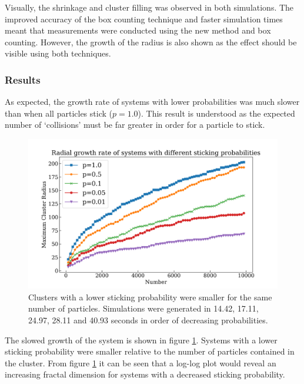 \documentclass[%
 aapm,
 mph,%
 amsmath,amssymb,
 reprint,%
]{revtex4-2}
\begin{document}
Visually, the shrinkage and cluster filling was observed in both simulations. The improved accuracy of the box counting technique and faster simulation times meant that measurements were conducted using the new method and box counting. However, the growth of the radius is also shown as the effect should be visible using both techniques.
\subsubsection{\label{sec:sticking_results}Results}
As expected, the growth rate of systems with lower probabilities was much slower than when all particles stick ($p=1.0$). This result is understood as the expected number of `collisions' must be far greater in order for a particle to stick.

\begin{figure}[h]
\centering
\includegraphics[width=\linewidth]{figures/2.png}
\caption{\label{fig:probability_growth}Clusters with a lower sticking probability were smaller for the same number of particles. Simulations were generated in 14.42, 17.11, 24.97, 28.11 and 40.93 seconds in order of decreasing probabilities.}
\end{figure}
The slowed growth of the system is shown in figure \ref{fig:probability_growth}. Systems with a lower sticking probability were smaller relative to the number of particles contained in the cluster. From figure \ref{fig:probability_growth} it can be seen that a log-log plot would reveal an increasing fractal dimension for systems with a decreased sticking probability.
\end{document}

